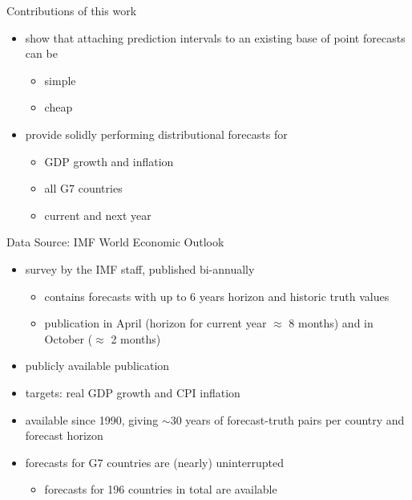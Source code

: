 \documentclass[en]{sdqbeamer}
\begin{document}
\begin{frame}[t]{Contributions of this work}
\begin{itemize}
    \item show that attaching prediction intervals to an existing base of point forecasts can be 
    \begin{itemize} 
    \item simple
    \item cheap
    \end{itemize}   
    \item provide solidly performing distributional forecasts for 
    \begin{itemize}
    \item  GDP growth and inflation
    \item  all G7 countries
    \item  current and next year 
    \end{itemize}
\end{itemize}
\end{frame}

   
\begin{frame}{Data Source: IMF World Economic Outlook}
	\begin{itemize}
		\item survey by the IMF staff, published bi-annually
		\begin{itemize}
            \item contains forecasts with up to 6 years horizon and historic truth values
		    \item publication in April (horizon for current year $\approx$ 8 months) and in October ($\approx$ 2 months)
		\end{itemize}
    \item publicly available publication
    \item targets: real GDP growth and CPI inflation 
    \item available since 1990, giving $\sim$30 years of forecast-truth pairs per country and forecast horizon
    \item forecasts for G7 countries are (nearly) uninterrupted
    \begin{itemize}
        \item forecasts for 196 countries in total are available
    \end{itemize}
	\end{itemize}
\end{frame}
\end{document}
